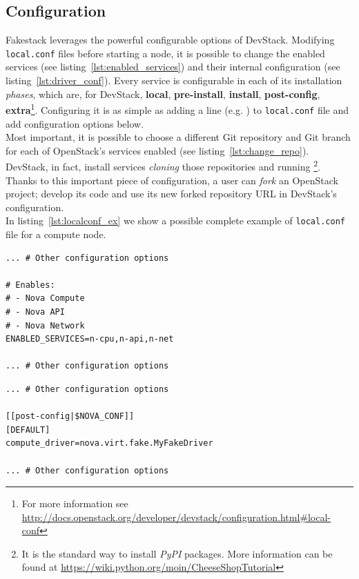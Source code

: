 \subsection{Configuration}
\label{sub:fakestack_conf}

Fakestack leverages the powerful configurable options of DevStack. Modifying \texttt{local.conf} files before starting a node, it is possible to change the enabled services (see listing~\ref{lst:enabled_services}) and their internal configuration (see listing~\ref{lst:driver_conf}). Every service is configurable in each of its installation \textit{phases}, which are, for DevStack, \textbf{local}, \textbf{pre-install}, \textbf{install}, \textbf{post-config}, \textbf{extra}\footnote{For more information see \url{http://docs.openstack.org/developer/devstack/configuration.html\#local-conf}}. Configuring it is as simple as adding a  line (e.g. ) to \texttt{local.conf} file and add configuration options below.\\
Most important, it is possible to choose a different Git repository and Git branch for each of OpenStack's services enabled (see listing~\ref{lst:change_repo}). DevStack, in fact, install services \textit{cloning} those repositories and running \footnote{\label{note:pypi}It is the standard way to install \textit{PyPI} packages. More information can be found at \url{https://wiki.python.org/moin/CheeseShopTutorial}}.\\
Thanks to this important piece of configuration, a user can \textit{fork} an OpenStack project; develop its code and use its new forked repository URL in DevStack's configuration.\\
In listing~\ref{lst:localconf_ex} we show a possible complete example of \texttt{local.conf} file for a compute node.

\begin{lstlisting}[floatplacement=H, caption={Choose OpenStack's enabled services}, label={lst:enabled_services}, numbers=none]
... # Other configuration options

# Enables:
# - Nova Compute
# - Nova API
# - Nova Network
ENABLED_SERVICES=n-cpu,n-api,n-net

... # Other configuration options
\end{lstlisting}

\begin{lstlisting}[floatplacement=H, caption={Internal configuration of Nova}, label={lst:driver_conf}, numbers=none]
... # Other configuration options

[[post-config|$NOVA_CONF]]
[DEFAULT]
compute_driver=nova.virt.fake.MyFakeDriver

... # Other configuration options
\end{lstlisting}

